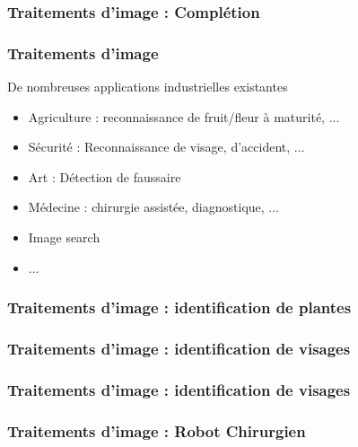 \documentclass{formation}
\begin{document}
\begin{frame}
  \frametitle{Traitements d'image : Complétion}
\end{frame}

\begin{frame}
  \frametitle{Traitements d'image}
  De nombreuses applications industrielles existantes
  \begin{itemize}
  \item Agriculture : reconnaissance de fruit/fleur à maturité, ...
  \item Sécurité : Reconnaissance de visage, d'accident, ...
  \item Art : Détection de faussaire
  \item Médecine : chirurgie assistée, diagnostique, ...
  \item Image search
  \item ...
  \end{itemize}
\end{frame}

\begin{frame} 
  \frametitle{Traitements d'image : identification de plantes}
\end{frame}

\begin{frame}
  \frametitle{Traitements d'image : identification de visages}
\end{frame}

\begin{frame}
  \frametitle{Traitements d'image : identification de visages}
\end{frame}

\begin{frame}
  \frametitle{Traitements d'image : Robot Chirurgien}
\end{frame}
\end{document}
